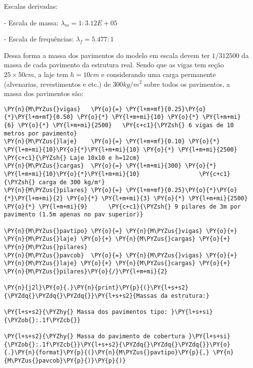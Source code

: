     
    Escalas derivadas:

- Escala de massa: $\lambda_m = 1:3.12E+05$

- Escala de frequências: $\lambda_f = 5.477:1$

    
    Dessa forma a massa dos pavimentos do modelo em escala devem ter
\(1/312500\) da massa de cada pavimento da estrutura real. Sendo que as
vigas tem seção \(25\times50 cm\), a laje tem \(h=10cm\) e considerando
uma carga permanente (alvenarias, revestimentos e etc.) de
\(300 kg/m^2\) sobre todos os pavimentos, a massa dos pavimentos são:

    \begin{tcolorbox}[breakable, size=fbox, boxrule=1pt, pad at break*=1mm,colback=cellbackground, colframe=cellborder]
\begin{Verbatim}[commandchars=\\\{\}]
\PY{n}{M\PYZus{}vigas}   \PY{o}{=} \PY{l+m+mf}{0.25}\PY{o}{*}\PY{l+m+mf}{0.50} \PY{o}{*} \PY{l+m+mi}{10} \PY{o}{*} \PY{l+m+mi}{6} \PY{o}{*} \PY{l+m+mi}{2500}   \PY{c+c1}{\PYZsh{} 6 vigas de 10 metros por pavimento}
\PY{n}{M\PYZus{}laje}    \PY{o}{=} \PY{l+m+mf}{0.10} \PY{o}{*} \PY{l+m+mi}{10}\PY{o}{*}\PY{l+m+mi}{10} \PY{o}{*} \PY{l+m+mi}{2500}         \PY{c+c1}{\PYZsh{} Laje 10x10 e h=12cm}
\PY{n}{M\PYZus{}cargas}  \PY{o}{=} \PY{l+m+mi}{300} \PY{o}{*} \PY{l+m+mi}{10}\PY{o}{*}\PY{l+m+mi}{10}                 \PY{c+c1}{\PYZsh{} carga de 300 kg/m²}
\PY{n}{M\PYZus{}pilares} \PY{o}{=} \PY{l+m+mf}{0.25}\PY{o}{*}\PY{o}{*}\PY{l+m+mi}{2} \PY{o}{*} \PY{l+m+mi}{3} \PY{o}{*} \PY{l+m+mi}{2500} \PY{o}{*} \PY{l+m+mi}{9}      \PY{c+c1}{\PYZsh{} 9 pilares de 3m por pavimento (1.5m apenas no pav superior)}

\PY{n}{M\PYZus{}pavtipo} \PY{o}{=} \PY{n}{M\PYZus{}vigas} \PY{o}{+} \PY{n}{M\PYZus{}laje} \PY{o}{+} \PY{n}{M\PYZus{}cargas} \PY{o}{+} \PY{n}{M\PYZus{}pilares}
\PY{n}{M\PYZus{}pavcob}  \PY{o}{=} \PY{n}{M\PYZus{}vigas} \PY{o}{+} \PY{n}{M\PYZus{}laje} \PY{o}{+} \PY{n}{M\PYZus{}cargas} \PY{o}{+} \PY{n}{M\PYZus{}pilares}\PY{o}{/}\PY{l+m+mi}{2}

\PY{n}{j2l}\PY{o}{.}\PY{n}{print}\PY{p}{(}\PY{l+s+s2}{\PYZdq{}\PYZdq{}\PYZdq{}}\PY{l+s+s2}{Massas da estrutura:}

\PY{l+s+s2}{\PYZhy{} Massa dos pavimentos tipo: }\PY{l+s+si}{\PYZob{}:.1f\PYZcb{}}

\PY{l+s+s2}{\PYZhy{} Massa do pavimento de cobertura }\PY{l+s+si}{\PYZob{}:.1f\PYZcb{}}\PY{l+s+s2}{\PYZdq{}\PYZdq{}\PYZdq{}}\PY{o}{.}\PY{n}{format}\PY{p}{(}\PY{n}{M\PYZus{}pavtipo}\PY{p}{,} \PY{n}{M\PYZus{}pavcob}\PY{p}{)}\PY{p}{)}
\end{Verbatim}
\end{tcolorbox}

